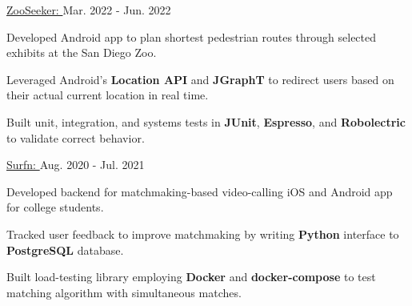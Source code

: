 
\begin{cventries}

  \cvproject
  {\href{https://github.com/Auroric/ZooSeeker}{ZooSeeker: }} %
  {Mar. 2022 - Jun. 2022} %
  {
    \begin{cvitems} %
      \item {Developed Android app to plan shortest pedestrian routes through selected exhibits at the San Diego Zoo.}
      \item {Leveraged Android's \textbf{Location API} and \textbf{JGraphT} to redirect users based on their actual current location in real time.}
      \item {Built unit, integration, and systems tests in \textbf{JUnit}, \textbf{Espresso}, and \textbf{Robolectric} to validate correct behavior.}
    \end{cvitems}
  }

  \cvproject
    {\href{https://surfn.app}{Surfn: }} %
    {Aug. 2020 - Jul. 2021} %
    {
      \begin{cvitems} %
        \item {Developed backend for matchmaking-based video-calling iOS and Android app for college students.}
        \item {Tracked user feedback to improve matchmaking by writing \textbf{Python} interface to \textbf{PostgreSQL} database.}
        \item {Built load-testing library employing \textbf{Docker} and \textbf{docker-compose} to test matching algorithm with simultaneous matches.}
      \end{cvitems}
    }
  
\end{cventries}